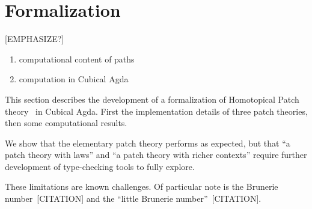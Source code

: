 \chapter{Formalization}\label{ch/formalization}

[EMPHASIZE?]
\begin{enumerate}
\item computational content of paths~\cite{Angiuli2016}
\item computation in Cubical Agda~\cite{vezzosi2021cubical, Angiuli2016}
\end{enumerate}

This section describes the development of a formalization of Homotopical Patch
theory~\cite{Angiuli2016} in Cubical Agda. First the implementation details of
three patch theories, then some computational results.

We show that the elementary patch theory performs as expected, but that ``a
patch theory with laws'' and ``a patch theory with richer contexts'' require
further development of type-checking tools to fully explore.

These limitations are known challenges. Of particular note is the Brunerie
number~[CITATION] and the ``little Brunerie number''~[CITATION].